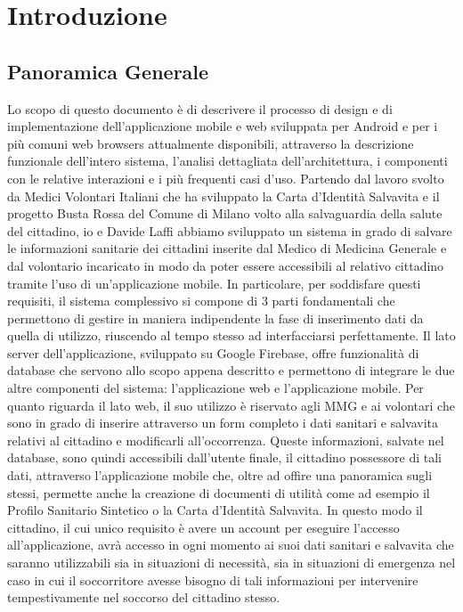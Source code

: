 \documentclass[12pt,a4paper,twoside,openright,titlepage]{book}
\begin{document}
\chapter{Introduzione}
%
\label{cap:introduzione}
\section{Panoramica Generale}
Lo scopo di questo documento è di descrivere il processo di design e di implementazione dell'applicazione mobile e web sviluppata per Android e per i più comuni web browsers attualmente disponibili, attraverso la descrizione funzionale dell'intero sistema, l'analisi dettagliata dell'architettura, i componenti con le relative interazioni e i più frequenti casi d'uso.\newline
Partendo dal lavoro svolto da Medici Volontari Italiani che ha sviluppato la Carta d'Identità Salvavita e il progetto Busta Rossa del Comune di Milano volto alla salvaguardia della salute del cittadino, io e Davide Laffi abbiamo sviluppato un sistema in grado di salvare le informazioni sanitarie dei cittadini inserite dal Medico di Medicina Generale e dal volontario incaricato in modo da poter essere accessibili al relativo cittadino tramite l'uso di un'applicazione mobile.\newline
In particolare, per soddisfare questi requisiti, il sistema complessivo si compone di 3 parti fondamentali che permettono di gestire in maniera indipendente la fase di inserimento dati da quella di utilizzo, riuscendo al tempo stesso ad interfacciarsi perfettamente. Il lato server dell'applicazione, sviluppato su Google Firebase, offre funzionalità di database che servono allo scopo appena descritto e permettono di integrare le due altre componenti del sistema: l'applicazione web e l'applicazione mobile. Per quanto riguarda il lato web, il suo utilizzo è riservato agli MMG e ai volontari che sono in grado di inserire attraverso un form completo i dati sanitari e salvavita relativi al cittadino e modificarli all'occorrenza. Queste informazioni, salvate nel database, sono quindi accessibili dall'utente finale, il cittadino possessore di tali dati, attraverso l'applicazione mobile che, oltre ad offire una panoramica sugli stessi, permette anche la creazione di documenti di utilità come ad esempio il Profilo Sanitario Sintetico o la Carta d'Identità Salvavita. In questo modo il cittadino, il cui unico requisito è avere un account per eseguire l'accesso all'applicazione, avrà accesso in ogni momento ai suoi dati sanitari e salvavita che saranno utilizzabili sia in situazioni di necessità, sia in situazioni di emergenza nel caso in cui il soccorritore avesse bisogno di tali informazioni per intervenire tempestivamente nel soccorso del cittadino stesso.
\end{document}

